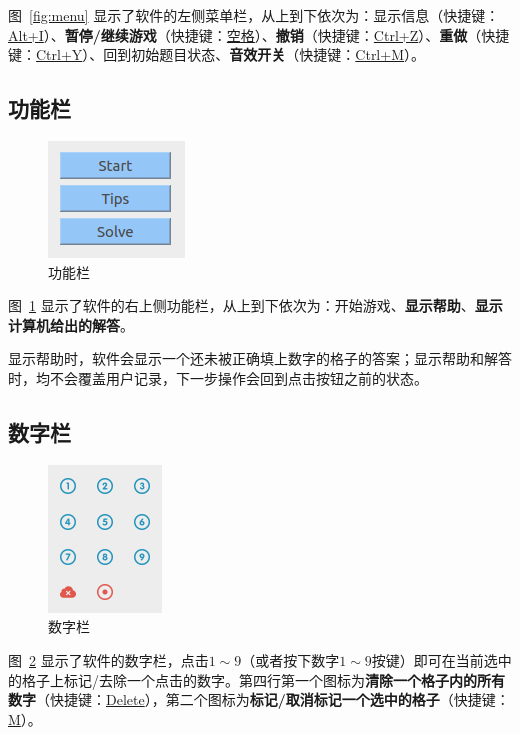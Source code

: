 \documentclass[a4paper]{article}
\begin{document}
图~\ref{fig:menu} 显示了软件的左侧菜单栏，从上到下依次为：显示信息（快捷键：\uline{Alt+I}）、{\bf 暂停/继续游戏}（快捷键：\uline{空格}）、{\bf 撤销}（快捷键：\uline{Ctrl+Z}）、{\bf 重做}（快捷键：\uline{Ctrl+Y}）、回到初始题目状态、{\bf 音效开关}（快捷键：\uline{Ctrl+M}）。
\subsection{功能栏}
\begin{figure}[htp]
\centering
\includegraphics[width=0.3\linewidth]{function.png}
\caption{功能栏}
\label{fig:func}
\end{figure}

图~\ref{fig:func} 显示了软件的右上侧功能栏，从上到下依次为：开始游戏、{\bf 显示帮助}、{\bf 显示计算机给出的解答}。

显示帮助时，软件会显示一个还未被正确填上数字的格子的答案；显示帮助和解答时，均不会覆盖用户记录，下一步操作会回到点击按钮之前的状态。
\subsection{数字栏}
\begin{figure}[htp]
\centering
\includegraphics[width=0.2\linewidth]{number.png}
\caption{数字栏}
\label{fig:num}
\end{figure}

图~\ref{fig:num} 显示了软件的数字栏，点击$1\sim 9$（或者按下数字$1\sim 9$按键）即可在当前选中的格子上标记/去除一个点击的数字。第四行第一个图标为{\bf 清除一个格子内的所有数字}（快捷键：\uline{Delete}），第二个图标为{\bf 标记/取消标记一个选中的格子}（快捷键：\uline{M}）。
\end{document}
